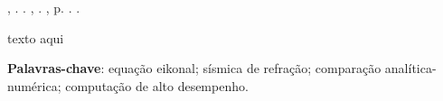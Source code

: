 \setlength{\absparsep}{18pt} %
\begin{resumo}
    \fonteResumo

\begin{flushleft}
\MakeUppercase{\imprimirSobrenome}, \imprimirPrimeirosNomes. \textbf{\imprimirtitulo}. \imprimirtipotrabalho, \imprimirinstituicao. \imprimirlocal,  p. \pageref{LastPage}. \imprimirAnoDeDefesa.
\end{flushleft}
	
	texto aqui
	
    \textbf{Palavras-chave}: equação eikonal; sísmica de refração; comparação analítica-numérica; computação de alto desempenho.
\end{resumo}
